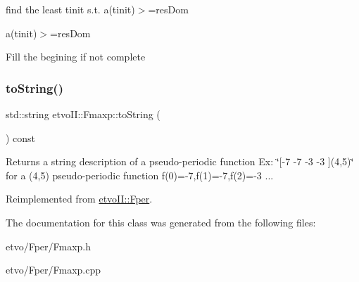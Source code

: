 find the least tinit s.\+t. a(tinit)$>$=res\+Dom

a(tinit)$>$=res\+Dom

Fill the begining if not complete \mbox{\label{classetvo_i_i_1_1_fmaxp_ac9d63f5e1e7eef10af1e3122f5dd4809}} 
\subsubsection{\texorpdfstring{to\+String()}{toString()}}
{\footnotesize\ttfamily std\+::string etvo\+I\+I\+::\+Fmaxp\+::to\+String (\begin{DoxyParamCaption}{ }\end{DoxyParamCaption}) const\hspace{0.3cm}{\ttfamily [virtual]}}

Returns a string description of a pseudo-\/periodic function Ex\+: \char`\"{}\mbox{[}-\/7 -\/7 -\/3 -\/3 \mbox{]}(4,5)\char`\"{} for a (4,5) pseudo-\/periodic function f(0)=-\/7,f(1)=-\/7,f(2)=-\/3 ... 

Reimplemented from \mbox{\hyperlink{classetvo_i_i_1_1_fper_a53276a36ff7ada879be26655ccff7ed6}{etvo\+I\+I\+::\+Fper}}.



The documentation for this class was generated from the following files\+:\begin{DoxyCompactItemize}
\item 
etvo/\+Fper/Fmaxp.\+h\item 
etvo/\+Fper/Fmaxp.\+cpp\end{DoxyCompactItemize}
